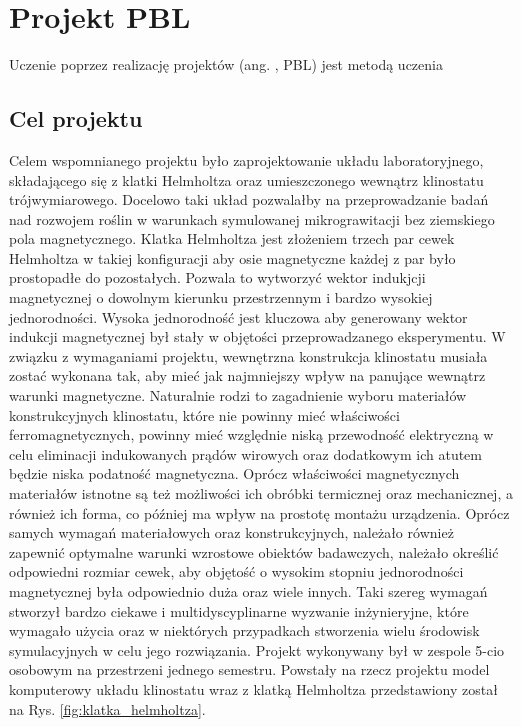 \graphicspath{{./PBL/images}}

\chapter{Projekt PBL}

Uczenie poprzez realizację projektów (ang. , PBL) jest metodą uczenia 

\section{Cel projektu} \label{cel_projektu}

Celem wspomnianego projektu było zaprojektowanie układu laboratoryjnego, składającego się z
 klatki Helmholtza oraz umieszczonego wewnątrz klinostatu trójwymiarowego. Docelowo taki układ
  pozwalałby na przeprowadzanie badań nad rozwojem roślin w warunkach symulowanej
   mikrograwitacji bez ziemskiego pola magnetycznego. Klatka Helmholtza jest złożeniem trzech
    par cewek Helmholtza w takiej konfiguracji aby osie magnetyczne każdej z par było
     prostopadłe do pozostałych. Pozwala to wytworzyć wektor indukjcji magnetycznej o dowolnym
      kierunku przestrzennym i bardzo wysokiej jednorodności. Wysoka jednorodność jest kluczowa
       aby generowany wektor indukcji magnetycznej był stały w objętości przeprowadzanego
        eksperymentu. W związku z wymaganiami projektu, wewnętrzna konstrukcja klinostatu
         musiała zostać wykonana tak, aby mieć jak najmniejszy wpływ na panujące wewnątrz
          warunki magnetyczne. Naturalnie rodzi to zagadnienie wyboru materiałów konstrukcyjnych
           klinostatu, które nie powinny mieć właściwości ferromagnetycznych, powinny mieć
            względnie niską przewodność elektryczną w celu eliminacji indukowanych prądów
             wirowych oraz dodatkowym ich atutem będzie niska podatność magnetyczna. Oprócz
              właściwości magnetycznych materiałów istnotne są też możliwości ich obróbki
               termicznej oraz mechanicznej, a również ich forma, co później ma wpływ na
                prostotę montażu urządzenia. Oprócz samych wymagań materiałowych oraz
                 konstrukcyjnych, należało również zapewnić optymalne warunki wzrostowe obiektów
                  badawczych, należało określić odpowiedni rozmiar cewek, aby objętość o wysokim
                   stopniu jednorodności magnetycznej była odpowiednio duża oraz wiele innych.
                    Taki szereg wymagań stworzył bardzo ciekawe i multidyscyplinarne wyzwanie
                     inżynieryjne, które wymagało użycia oraz w niektórych przypadkach
                      stworzenia wielu środowisk symulacyjnych w celu jego rozwiązania. Projekt
                       wykonywany był w zespole 5-cio osobowym na przestrzeni jednego semestru.
                        Powstały na rzecz projektu model komputerowy układu klinostatu wraz z
                         klatką Helmholtza przedstawiony został na Rys.
                          \ref{fig:klatka_helmholtza}.
                          

